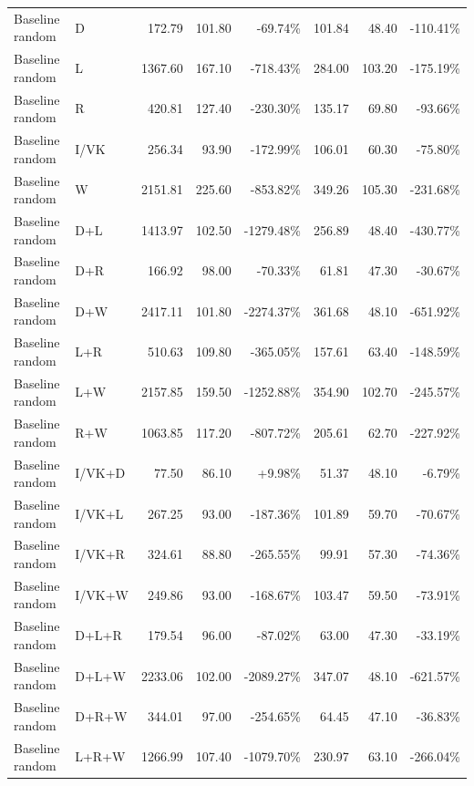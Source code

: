 \documentclass[UTF8,10pt]{ctexart}
\newcommand{\better}[1]{\textcolor{goodblue}{#1}}
\newcommand{\worse}[1]{\textcolor{badred}{#1}}
\begin{document}
{\begin{longtable}{llrrrrrr}
Baseline random & D & 172.79 & 101.80 & \worse{-69.74\%} & 101.84 & 48.40 & \worse{-110.41\%}\\
Baseline random & L & 1367.60 & 167.10 & \worse{-718.43\%} & 284.00 & 103.20 & \worse{-175.19\%}\\
Baseline random & R & 420.81 & 127.40 & \worse{-230.30\%} & 135.17 & 69.80 & \worse{-93.66\%}\\
Baseline random & I/VK & 256.34 & 93.90 & \worse{-172.99\%} & 106.01 & 60.30 & \worse{-75.80\%}\\
Baseline random & W & 2151.81 & 225.60 & \worse{-853.82\%} & 349.26 & 105.30 & \worse{-231.68\%}\\
Baseline random & D+L & 1413.97 & 102.50 & \worse{-1279.48\%} & 256.89 & 48.40 & \worse{-430.77\%}\\
Baseline random & D+R & 166.92 & 98.00 & \worse{-70.33\%} & 61.81 & 47.30 & \worse{-30.67\%}\\
Baseline random & D+W & 2417.11 & 101.80 & \worse{-2274.37\%} & 361.68 & 48.10 & \worse{-651.92\%}\\
Baseline random & L+R & 510.63 & 109.80 & \worse{-365.05\%} & 157.61 & 63.40 & \worse{-148.59\%}\\
Baseline random & L+W & 2157.85 & 159.50 & \worse{-1252.88\%} & 354.90 & 102.70 & \worse{-245.57\%}\\
Baseline random & R+W & 1063.85 & 117.20 & \worse{-807.72\%} & 205.61 & 62.70 & \worse{-227.92\%}\\
Baseline random & I/VK+D & 77.50 & 86.10 & \better{+9.98\%} & 51.37 & 48.10 & \worse{-6.79\%}\\
Baseline random & I/VK+L & 267.25 & 93.00 & \worse{-187.36\%} & 101.89 & 59.70 & \worse{-70.67\%}\\
Baseline random & I/VK+R & 324.61 & 88.80 & \worse{-265.55\%} & 99.91 & 57.30 & \worse{-74.36\%}\\
Baseline random & I/VK+W & 249.86 & 93.00 & \worse{-168.67\%} & 103.47 & 59.50 & \worse{-73.91\%}\\
Baseline random & D+L+R & 179.54 & 96.00 & \worse{-87.02\%} & 63.00 & 47.30 & \worse{-33.19\%}\\
Baseline random & D+L+W & 2233.06 & 102.00 & \worse{-2089.27\%} & 347.07 & 48.10 & \worse{-621.57\%}\\
Baseline random & D+R+W & 344.01 & 97.00 & \worse{-254.65\%} & 64.45 & 47.10 & \worse{-36.83\%}\\
Baseline random & L+R+W & 1266.99 & 107.40 & \worse{-1079.70\%} & 230.97 & 63.10 & \worse{-266.04\%}\\

\end{longtable}}
\end{document}
